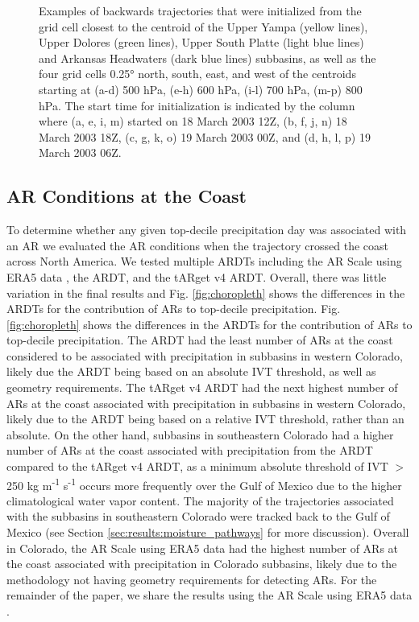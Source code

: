 \documentclass[draft]{agujournal2019}
\begin{document}
\begin{figure}
\label{fig:sensitivity_tests}
\caption{Examples of backwards trajectories that were initialized from the grid cell closest to the centroid of the Upper Yampa (yellow lines), Upper Dolores (green lines), Upper South Platte (light blue lines) and Arkansas Headwaters (dark blue lines) subbasins, as well as the four grid cells 0.25° north, south, east, and west of the centroids starting at (a-d) 500 hPa, (e-h) 600 hPa, (i-l) 700 hPa, (m-p) 800 hPa. The start time for initialization is indicated by the column where (a, e, i, m) started on 18 March 2003 12Z, (b, f, j, n) 18 March 2003 18Z, (c, g, k, o) 19 March 2003 00Z, and (d, h, l, p) 19 March 2003 06Z. }
\end{figure}

\subsection{AR Conditions at the Coast}
\label{sec:methods:ar_conditions}
To determine whether any given top-decile precipitation day was associated with an AR we evaluated the AR conditions when the trajectory crossed the coast across North America. We tested multiple ARDTs including the AR Scale using ERA5 data \cite{MartinRalph2019}, the  ARDT, and the \cite{Guan2024AERA5} tARget v4 ARDT. Overall, there was little variation in the final results and Fig. \ref{fig:choropleth} shows the differences in the ARDTs for the contribution of ARs to top-decile precipitation. Fig. \ref{fig:choropleth} shows the differences in the ARDTs for the contribution of ARs to top-decile precipitation. The  ARDT had the least number of ARs at the coast considered to be associated with precipitation in subbasins in western Colorado, likely due the ARDT being based on an absolute IVT threshold, as well as geometry requirements. The \cite{Guan2024AERA5} tARget v4 ARDT had the next highest number of ARs at the coast associated with precipitation in subbasins in western Colorado, likely due to the ARDT being based on a relative IVT threshold, rather than an absolute. On the other hand, subbasins in southeastern Colorado had a higher number of ARs at the coast associated with precipitation from the  ARDT compared to the \cite{Guan2024AERA5} tARget v4 ARDT, as a minimum absolute threshold of IVT $>$ 250 kg m\textsuperscript{-1} s\textsuperscript{-1} occurs more frequently over the Gulf of Mexico due to the higher climatological water vapor content. The majority of the trajectories associated with the subbasins in southeastern Colorado were tracked back to the Gulf of Mexico (see Section \ref{sec:results:moisture_pathways} for more discussion). Overall in Colorado, the AR Scale using ERA5 data \cite{MartinRalph2019} had the highest number of ARs at the coast associated with precipitation in Colorado subbasins, likely due to the methodology not having geometry requirements for detecting ARs. For the remainder of the paper, we share the results using the AR Scale using ERA5 data \cite{MartinRalph2019}.
\end{document}
